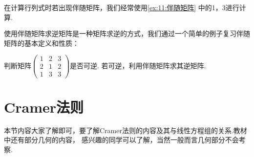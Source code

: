 在计算行列式时若出现伴随矩阵，我们经常使用\autoref{ex:11:伴随矩阵} 中的1，3进行计算.

使用伴随矩阵求逆矩阵是一种矩阵求逆的方式，我们通过一个简单的例子复习伴随矩阵的基本定义和性质：
\begin{example}
    判断矩阵$\begin{pmatrix}
        1 & 2 & 3 \\ 2 & 1 & 2 \\ 1 & 3 & 3
    \end{pmatrix}$是否可逆. 若可逆，利用伴随矩阵求其逆矩阵.
\end{example}
\begin{solution}

\end{solution}

\section{Cramer法则}
本节内容大家了解即可，要了解Cramer法则的内容及其与线性方程组的关系.教材中还有部分几何的内容，
感兴趣的同学可以了解，当然一般而言几何部分不会考察.
